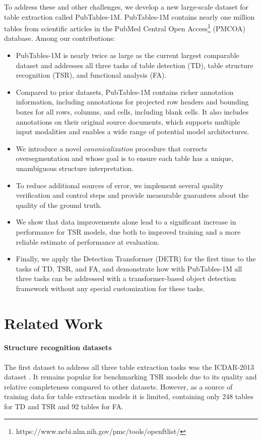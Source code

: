 \documentclass[10pt,twocolumn,letterpaper]{article}
\begin{document}
To address these and other challenges, we develop a new large-scale dataset for table extraction called PubTables-1M.
PubTables-1M contains nearly one million tables from scientific articles in the PubMed Central Open Access\footnote{https://www.ncbi.nlm.nih.gov/pmc/tools/openftlist/} (PMCOA) database.
Among our contributions:
\begin{itemize}
	\item PubTables-1M is nearly twice as large as the current largest comparable dataset and addresses all three tasks of table detection (TD), table structure recognition (TSR), and functional analysis (FA).
	\item Compared to prior datasets, PubTables-1M contains richer annotation information, including annotations for projected row headers and bounding boxes for all rows, columns, and cells, including blank cells. It also includes annotations on their original source documents, which supports multiple input modalities and enables a wide range of potential model architectures.
	\item We introduce a novel \textit{canonicalization} procedure that corrects oversegmentation and whose goal is to ensure each table has a unique, unambiguous structure interpretation.
	\item To reduce additional sources of error, we implement several quality verification and control steps and provide measurable guarantees about the quality of the ground truth.
	\item We show that data improvements alone lead to a significant increase in performance for TSR models, due both to improved training and a more reliable estimate of performance at evaluation.
	\item Finally, we apply the Detection Transformer (DETR) \cite{carion2020end} for the first time to the tasks of TD, TSR, and FA, and demonstrate how with PubTables-1M all three tasks can be addressed with a transformer-based object detection framework without any special customization for these tasks.
\end{itemize}

\section{Related Work}

\paragraph{Structure recognition datasets} The first dataset to address all three table extraction tasks was the ICDAR-2013 dataset \cite{gobel2013icdar}.
It remains popular for benchmarking TSR models due to its quality and relative completeness compared to other datasets.
However, as a source of training data for table extraction models it is limited, containing only 248 tables for TD and TSR and 92 tables for FA.
\end{document}
